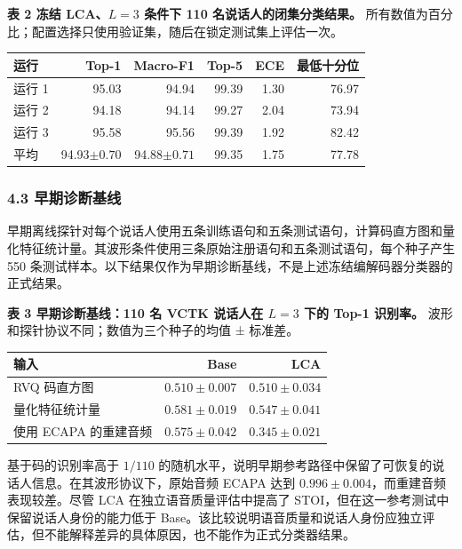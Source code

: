 \documentclass[12pt]{article}
\newcounter{none}
\begin{document}
\textbf{表 2 冻结 LCA、\(L=3\) 条件下 110 名说话人的闭集分类结果。}
所有数值为百分比；配置选择只使用验证集，随后在锁定测试集上评估一次。

{\def\LTcaptype{none} %
\begin{longtable}[]{@{}lrrrrr@{}}
\toprule\noalign{}
运行 & Top-1 & Macro-F1 & Top-5 & ECE & 最低十分位 \\
\midrule\noalign{}
\endhead
\bottomrule\noalign{}
\endlastfoot
运行 1 & 95.03 & 94.94 & 99.39 & 1.30 & 76.97 \\
运行 2 & 94.18 & 94.14 & 99.27 & 2.04 & 73.94 \\
运行 3 & 95.58 & 95.56 & 99.39 & 1.92 & 82.42 \\
平均 & 94.93\(\pm0.70\) & 94.88\(\pm0.71\) & 99.35 & 1.75 & 77.78 \\
\end{longtable}
}

\subsubsection{4.3 早期诊断基线}\label{speaker-diagnostic-baseline-zh}

早期离线探针对每个说话人使用五条训练语句和五条测试语句，计算码直方图和量化特征统计量。其波形条件使用三条原始注册语句和五条测试语句，每个种子产生
550 条测试样本。以下结果仅作为早期诊断基线，不是上述冻结编解码器分类器的正式结果。

\textbf{表 3 早期诊断基线：110 名 VCTK 说话人在 \(L=3\) 下的 Top-1
识别率。} 波形和探针协议不同；数值为三个种子的均值 ± 标准差。

{\def\LTcaptype{none} %
\begin{longtable}[]{@{}lrr@{}}
\toprule\noalign{}
输入 & Base & LCA \\
\midrule\noalign{}
\endhead
\bottomrule\noalign{}
\endlastfoot
RVQ 码直方图 & \(0.510\pm0.007\) & \(0.510\pm0.034\) \\
量化特征统计量 & \(0.581\pm0.019\) & \(0.547\pm0.041\) \\
使用 ECAPA 的重建音频 & \(0.575\pm0.042\) & \(0.345\pm0.021\) \\
\end{longtable}
}

基于码的识别率高于 \(1/110\) 的随机水平，说明早期参考路径中保留了可恢复的说话人信息。在其波形协议下，原始音频 ECAPA 达到
\(0.996\pm0.004\)，而重建音频表现较差。尽管 LCA
在独立语音质量评估中提高了
STOI，但在这一参考测试中保留说话人身份的能力低于
Base。该比较说明语音质量和说话人身份应独立评估，但不能解释差异的具体原因，也不能作为正式分类器结果。
\end{document}
